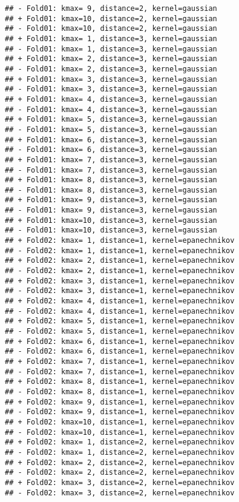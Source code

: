 \documentclass[
]{article}
\begin{document}
\begin{verbatim}
## - Fold01: kmax= 9, distance=2, kernel=gaussian 
## + Fold01: kmax=10, distance=2, kernel=gaussian 
## - Fold01: kmax=10, distance=2, kernel=gaussian 
## + Fold01: kmax= 1, distance=3, kernel=gaussian 
## - Fold01: kmax= 1, distance=3, kernel=gaussian 
## + Fold01: kmax= 2, distance=3, kernel=gaussian 
## - Fold01: kmax= 2, distance=3, kernel=gaussian 
## + Fold01: kmax= 3, distance=3, kernel=gaussian 
## - Fold01: kmax= 3, distance=3, kernel=gaussian 
## + Fold01: kmax= 4, distance=3, kernel=gaussian 
## - Fold01: kmax= 4, distance=3, kernel=gaussian 
## + Fold01: kmax= 5, distance=3, kernel=gaussian 
## - Fold01: kmax= 5, distance=3, kernel=gaussian 
## + Fold01: kmax= 6, distance=3, kernel=gaussian 
## - Fold01: kmax= 6, distance=3, kernel=gaussian 
## + Fold01: kmax= 7, distance=3, kernel=gaussian 
## - Fold01: kmax= 7, distance=3, kernel=gaussian 
## + Fold01: kmax= 8, distance=3, kernel=gaussian 
## - Fold01: kmax= 8, distance=3, kernel=gaussian 
## + Fold01: kmax= 9, distance=3, kernel=gaussian 
## - Fold01: kmax= 9, distance=3, kernel=gaussian 
## + Fold01: kmax=10, distance=3, kernel=gaussian 
## - Fold01: kmax=10, distance=3, kernel=gaussian 
## + Fold02: kmax= 1, distance=1, kernel=epanechnikov 
## - Fold02: kmax= 1, distance=1, kernel=epanechnikov 
## + Fold02: kmax= 2, distance=1, kernel=epanechnikov 
## - Fold02: kmax= 2, distance=1, kernel=epanechnikov 
## + Fold02: kmax= 3, distance=1, kernel=epanechnikov 
## - Fold02: kmax= 3, distance=1, kernel=epanechnikov 
## + Fold02: kmax= 4, distance=1, kernel=epanechnikov 
## - Fold02: kmax= 4, distance=1, kernel=epanechnikov 
## + Fold02: kmax= 5, distance=1, kernel=epanechnikov 
## - Fold02: kmax= 5, distance=1, kernel=epanechnikov 
## + Fold02: kmax= 6, distance=1, kernel=epanechnikov 
## - Fold02: kmax= 6, distance=1, kernel=epanechnikov 
## + Fold02: kmax= 7, distance=1, kernel=epanechnikov 
## - Fold02: kmax= 7, distance=1, kernel=epanechnikov 
## + Fold02: kmax= 8, distance=1, kernel=epanechnikov 
## - Fold02: kmax= 8, distance=1, kernel=epanechnikov 
## + Fold02: kmax= 9, distance=1, kernel=epanechnikov 
## - Fold02: kmax= 9, distance=1, kernel=epanechnikov 
## + Fold02: kmax=10, distance=1, kernel=epanechnikov 
## - Fold02: kmax=10, distance=1, kernel=epanechnikov 
## + Fold02: kmax= 1, distance=2, kernel=epanechnikov 
## - Fold02: kmax= 1, distance=2, kernel=epanechnikov 
## + Fold02: kmax= 2, distance=2, kernel=epanechnikov 
## - Fold02: kmax= 2, distance=2, kernel=epanechnikov 
## + Fold02: kmax= 3, distance=2, kernel=epanechnikov 
## - Fold02: kmax= 3, distance=2, kernel=epanechnikov 

\end{verbatim}
\end{document}
